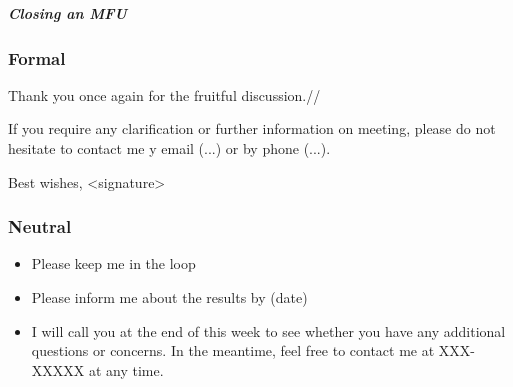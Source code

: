 \subparagraph{Closing an MFU}

\subsubsection{Formal}
Thank you once again for the fruitful discussion.//

If you require any clarification or further information on meeting, please do not hesitate to contact me y email (...) or by phone (...).

Best wishes,
<signature>

\subsubsection{Neutral}
\begin{itemize}
\item Please keep me in the loop
\item Please inform me about the results by (date)
\item I will call you at the end of this week to see whether you have any additional questions or concerns. In the meantime, feel free to contact me at XXX-XXXXX at any time.
\end{itemize}

